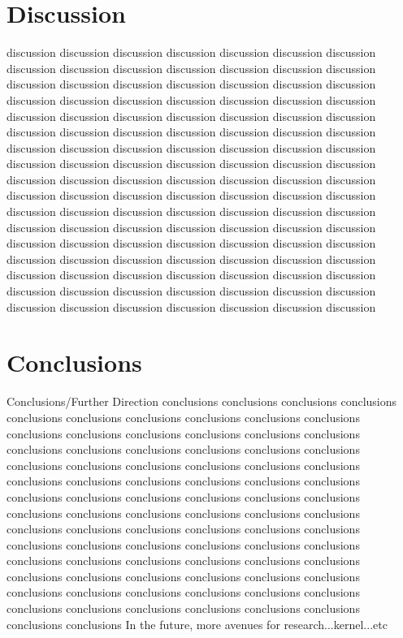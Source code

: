 \documentclass{IEEEtran}
\begin{document}
\section{Discussion}
discussion discussion discussion discussion discussion discussion discussion
discussion discussion discussion discussion discussion discussion discussion
discussion discussion discussion discussion discussion discussion discussion
discussion discussion discussion discussion discussion discussion discussion
discussion discussion discussion discussion discussion discussion discussion
discussion discussion discussion discussion discussion discussion discussion
discussion discussion discussion discussion discussion discussion discussion
discussion discussion discussion discussion discussion discussion discussion
discussion discussion discussion discussion discussion discussion discussion
discussion discussion discussion discussion discussion discussion discussion
discussion discussion discussion discussion discussion discussion discussion
discussion discussion discussion discussion discussion discussion discussion
discussion discussion discussion discussion discussion discussion discussion
discussion discussion discussion discussion discussion discussion discussion
discussion discussion discussion discussion discussion discussion discussion
discussion discussion discussion discussion discussion discussion discussion
discussion discussion discussion discussion discussion discussion discussion


\section{Conclusions}
Conclusions/Further Direction
conclusions conclusions conclusions conclusions conclusions conclusions conclusions 
conclusions conclusions conclusions conclusions conclusions conclusions conclusions 
conclusions conclusions conclusions conclusions conclusions conclusions conclusions 
conclusions conclusions conclusions conclusions conclusions conclusions conclusions 
conclusions conclusions conclusions conclusions conclusions conclusions conclusions 
conclusions conclusions conclusions conclusions conclusions conclusions conclusions 
conclusions conclusions conclusions conclusions conclusions conclusions conclusions 
conclusions conclusions conclusions conclusions conclusions conclusions conclusions 
conclusions conclusions conclusions conclusions conclusions conclusions conclusions 
conclusions conclusions conclusions conclusions conclusions conclusions conclusions 
conclusions conclusions conclusions conclusions conclusions conclusions conclusions 
conclusions conclusions conclusions conclusions conclusions conclusions conclusions 
In the future, more avenues for research...kernel...etc




\end{document}
